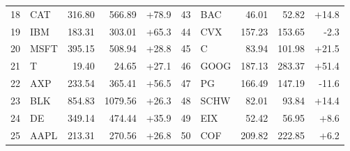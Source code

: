 \begin{tabular}{rlrrr@{\hspace{2em}}rlrrr}
18 & CAT & 316.80 & 566.89 & \textcolor{pos}{+78.9} & 43 & BAC & 46.01 & 52.82 & \textcolor{pos}{+14.8} \\
19 & IBM & 183.31 & 303.01 & \textcolor{pos}{+65.3} & 44 & CVX & 157.23 & 153.65 & \textcolor{neg}{-2.3} \\
20 & MSFT & 395.15 & 508.94 & \textcolor{pos}{+28.8} & 45 & C & 83.94 & 101.98 & \textcolor{pos}{+21.5} \\
21 & T & 19.40 & 24.65 & \textcolor{pos}{+27.1} & 46 & GOOG & 187.13 & 283.37 & \textcolor{pos}{+51.4} \\
22 & AXP & 233.54 & 365.41 & \textcolor{pos}{+56.5} & 47 & PG & 166.49 & 147.19 & \textcolor{neg}{-11.6} \\
23 & BLK & 854.83 & 1079.56 & \textcolor{pos}{+26.3} & 48 & SCHW & 82.01 & 93.84 & \textcolor{pos}{+14.4} \\
24 & DE & 349.14 & 474.44 & \textcolor{pos}{+35.9} & 49 & EIX & 52.42 & 56.95 & \textcolor{pos}{+8.6} \\
25 & AAPL & 213.31 & 270.56 & \textcolor{pos}{+26.8} & 50 & COF & 209.82 & 222.85 & \textcolor{pos}{+6.2} \\
\bottomrule
\end{tabular}
